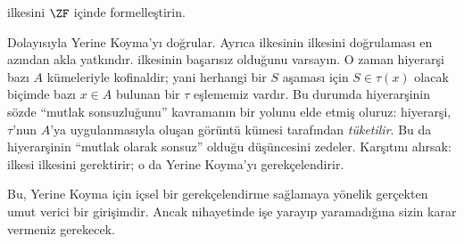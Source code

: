 \documentclass[../../../include/open-logic-section]{subfiles}
\begin{document}
\begin{prob}
	\stagescofin{} ilkesini $\ZF$ içinde formelleştirin.
\end{prob}

Dolayısıyla \stagescofin{} Yerine Koyma'yı doğrular. Ayrıca
\stagesinex{} ilkesinin \stagescofin{} ilkesini doğrulaması en azından akla
yatkındır. \stagescofin{} ilkesinin başarısız olduğunu varsayın. O zaman
hiyerarşi bazı $A$ kümeleriyle kofinaldir; yani herhangi bir $S$ aşaması için
$S \in \tau(x)$ olacak biçimde bazı $x \in A$ bulunan bir $\tau$ eşlememiz
vardır. Bu durumda hiyerarşinin sözde ``mutlak sonsuzluğunu'' kavramanın bir
yolunu elde etmiş oluruz: hiyerarşi, $\tau$'nun $A$'ya uygulanmasıyla oluşan
görüntü kümesi tarafından \emph{tüketilir}. Bu da hiyerarşinin ``mutlak
olarak sonsuz'' olduğu düşüncesini zedeler. Karşıtını alırsak:
\stagesinex{} ilkesi \stagescofin{} ilkesini gerektirir; o da Yerine
Koyma'yı gerekçelendirir.

Bu, Yerine Koyma için içsel bir gerekçelendirme sağlamaya yönelik gerçekten
umut verici bir girişimdir. Ancak nihayetinde işe yarayıp yaramadığına sizin
karar vermeniz gerekecek.
\end{document}
